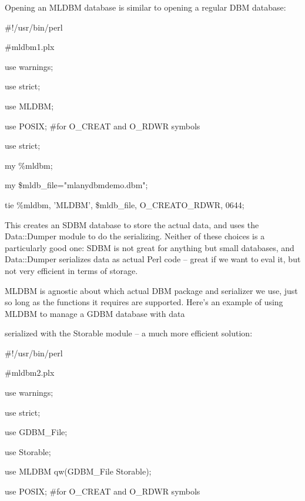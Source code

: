 \documentclass[a4paper,11pt]{book}
\begin{document}
\noindent 

\noindent Opening an MLDBM database is similar to opening a regular DBM database:

\noindent 

\noindent \#!/usr/bin/perl

\noindent \#mldbm1.plx

\noindent use warnings;

\noindent use strict;

\noindent use MLDBM;

\noindent use POSIX; \#for O\_CREAT and O\_RDWR symbols

\noindent use strict;

\noindent 

\noindent my \%mldbm;

\noindent my \$mldb\_file="mlanydbmdemo.dbm";

\noindent 

\noindent tie \%mldbm, 'MLDBM', \$mldb\_file, O\_CREAT\textbar O\_RDWR, 0644;

\noindent 

\noindent This creates an SDBM database to store the actual data, and uses the Data::Dumper module to do the serializing. Neither of these choices is a particularly good one: SDBM is not great for anything but small databases, and Data::Dumper serializes data as actual Perl code -- great if we want to eval it, but not very efficient in terms of storage.

\noindent 

\noindent MLDBM is agnostic about which actual DBM package and serializer we use, just so long as the functions it requires are supported. Here's an example of using MLDBM to manage a GDBM database with data

\noindent serialized with the Storable module -- a much more efficient solution:

\noindent 

\noindent 

\noindent \#!/usr/bin/perl

\noindent \#mldbm2.plx

\noindent use warnings;

\noindent use strict;

\noindent use GDBM\_File;

\noindent use Storable;

\noindent use MLDBM qw(GDBM\_File Storable);

\noindent use POSIX; \#for O\_CREAT and O\_RDWR symbols
\end{document}
